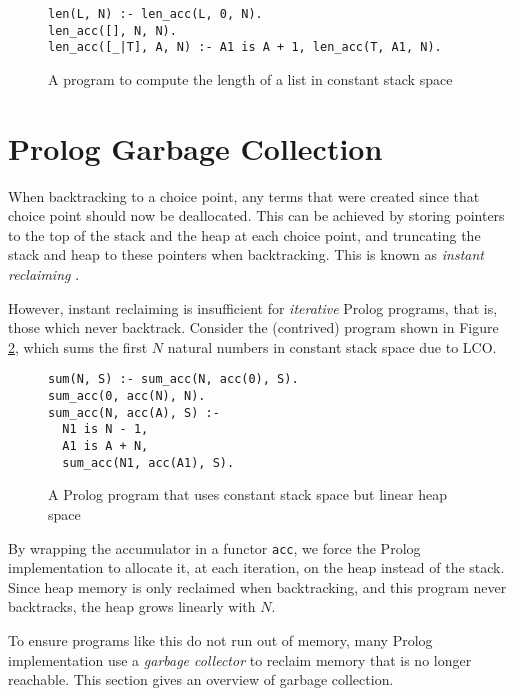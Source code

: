 \begin{figure}[H]
\begin{center}
\begin{verbatim}
len(L, N) :- len_acc(L, 0, N).
len_acc([], N, N).
len_acc([_|T], A, N) :- A1 is A + 1, len_acc(T, A1, N).
\end{verbatim}
\end{center}
\caption{A program to compute the length of a list in constant stack space}
\label{fig:lco}
\end{figure}

\section{Prolog Garbage Collection}

\label{sec:prolog-gc}

When backtracking to a choice point, any terms that were created since that choice point should now be deallocated. This can be achieved by storing pointers to the top of the stack and the heap at each choice point, and truncating the stack and heap to these pointers when backtracking. This is known as \emph{instant reclaiming} \cite{bekkersDynamicMemoryManagement1992}.

However, instant reclaiming is insufficient for \emph{iterative} Prolog programs, that is, those which never backtrack. Consider the (contrived) program shown in Figure \ref{fig:iterative}, which sums the first $N$ natural numbers in constant stack space due to LCO.

\begin{figure}[H]
\begin{center}
\begin{verbatim}
sum(N, S) :- sum_acc(N, acc(0), S).
sum_acc(0, acc(N), N).
sum_acc(N, acc(A), S) :-
  N1 is N - 1,
  A1 is A + N,
  sum_acc(N1, acc(A1), S).
\end{verbatim}
\end{center}
\caption{A Prolog program that uses constant stack space but linear heap space}
\label{fig:iterative}
\end{figure}

By wrapping the accumulator in a functor \texttt{acc}, we force the Prolog implementation to allocate it, at each iteration, on the heap instead of the stack. Since heap memory is only reclaimed when backtracking, and this program never backtracks, the heap grows linearly with $N$.

To ensure programs like this do not run out of memory, many Prolog implementation use a \emph{garbage collector} to reclaim memory that is no longer reachable. This section gives an overview of garbage collection.

